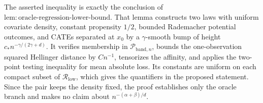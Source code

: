The asserted inequality is exactly the conclusion of
\(\mathrm{lem:oracle\mbox{-}regression\mbox{-}lower\mbox{-}bound}\).  That
lemma constructs two laws with uniform covariate density, constant propensity
\(1/2\), bounded Rademacher potential outcomes, and CATEs separated at
\(x_0\) by a \(\gamma\)-smooth bump of height
\(c_*n^{-\gamma/(2\gamma+d)}\).  It verifies membership in
\(\mathcal P_{\mathrm{band},n}\), bounds the one-observation squared Hellinger
distance by \(C n^{-1}\), tensorizes the affinity, and applies the two-point
testing inequality for mean absolute loss.  Its constants are uniform on each
compact subset of \(\mathcal R_{\mathrm{low}}\), which gives the quantifiers
in the proposed statement.  Since the pair keeps the density fixed, the proof
establishes only the oracle branch and makes no claim about
\(n^{-(\alpha+\beta)/d}\).